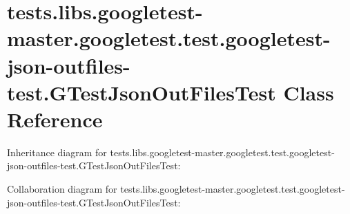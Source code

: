 \hypertarget{classtests_1_1libs_1_1googletest-master_1_1googletest_1_1test_1_1googletest-json-outfiles-test_1_1GTestJsonOutFilesTest}{}\section{tests.\+libs.\+googletest-\/master.googletest.\+test.\+googletest-\/json-\/outfiles-\/test.G\+Test\+Json\+Out\+Files\+Test Class Reference}
\label{classtests_1_1libs_1_1googletest-master_1_1googletest_1_1test_1_1googletest-json-outfiles-test_1_1GTestJsonOutFilesTest}


Inheritance diagram for tests.\+libs.\+googletest-\/master.googletest.\+test.\+googletest-\/json-\/outfiles-\/test.G\+Test\+Json\+Out\+Files\+Test\+:


Collaboration diagram for tests.\+libs.\+googletest-\/master.googletest.\+test.\+googletest-\/json-\/outfiles-\/test.G\+Test\+Json\+Out\+Files\+Test\+:
